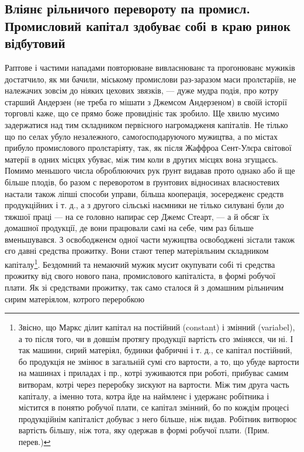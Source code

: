 \subsection{Вліянє рільничого перевороту па промисл.
Промисловий капітал здобуває собі в краю ринок
відбутовий}

Раптове і частими нападами повторюване вивласнюванє
та прогонюванє мужиків достатчило, як ми бачили,
міському промислови раз-заразом маси пролєтаріїв, не належачих
зовсім до ніяких цехових звязків, — дуже мудра
подія, про котру старший Андерзен (не треба го мішати
з Джемсом Андерзеном) в своїй історії торговлі каже, що
се прямо боже провидініє так зробило. Ще хвилю мусимо
задержатися над тим складником первісного нагромадженя
капіталів. Не тілько що по селах убуло незалежного, самоґосподаруючого
мужицтва, а по містах прибуло промислового
пролєтаріяту, так, як після Жаффроа Сент-Улєра світової
матерії в одних місцях убуває, між тим коли в других
місцях вона згущаєсь. Помимо меньшого числа оброблюючих
рук ґрунт видавав прото однако або й ще більше
плодів, бо разом с переворотом в ґрунтових відносинах
власностевих настали також ліпші способи управи, більша
кооперація, зосередженє средств продукційних і т. д., а з другого
сільські наємники не тілько силувані були до тяжшої
праці — на се головно напирає сер Джемс Стеарт, —
а й обсяг їх домашної продукції, де вони працювали самі
на себе, чим раз більше вменьшувався. З освободженєм
одної части мужицтва освободжені зістали також єго давні
средства прожитку. Вони стают тепер матеріяльним складником
 капіталу\footnote*{
Звісно, що Маркс ділит капітал на постійний (constant) і змінний
(variabel), а то після того, чи в довшім протягу продукції вартість
єго зміняєся, чи ні. І так машини, сирий матеріял, будинки фабричні
і т. д., се капітал постійний, бо продукція не змінює в загальній сумі
єго вартости, а то, що убуде вартости на машинах і приладах і пр.,
котрі зуживаются при роботі, прибуває самим витворам, котрі через переробку
зискуют на вартости. Між тим друга часть капіталу, а іменно
тота, котра йде на наймленє і удержанє робітника і містится в понятю
робучої плати, се капітал змінний, бо по кождім процесі продукційнім
капіталіст добуває з него більше, ніж видав. Робітник витворює вартість
більшу, ніж тота, яку одержав в формі робучої плати. (Прим. перев.)
}. Бездомний та немаючий мужик
мусит окупувати собі ті средства прожитку від свого
нового пана, промислового капіталіста, в формі робучої
плати. Як зі средствами прожитку, так само сталося й з домашним
рільничим сирим матеріялом, котрого переробкою
